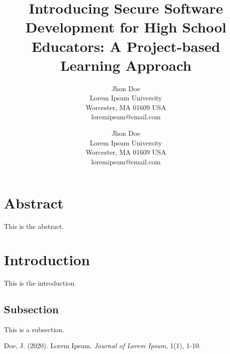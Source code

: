 \documentclass[letterpaper,twocolumn]{article}
\begin{document}
\date{} %
\title{Introducing Secure Software Development for High School Educators: A Project-based Learning Approach}
\author{
        {\rm Jhon Doe}\\
        Lorem Ipsum University\\
        Worcester, MA 01609 USA\\
        loremipsum@email.com\\
        \and
        {\rm Jhon Doe}\\
        Lorem Ipsum University\\
        Worcester, MA 01609 USA\\
        loremipsum@email.com\\
    }
\maketitle %
\thispagestyle{fancy} %

\section*{Abstract} %
This is the abstract.

\section{Introduction} %
This is the introduction. \cite{1}

\subsection{Subsection} %
This is a subsection.

\begin{thebibliography}{9}
    Doe, J. (2020). Lorem Ipsum. \textit{Journal of Lorem Ipsum}, 1(1), 1-10.
\end{thebibliography}
\end{document}
